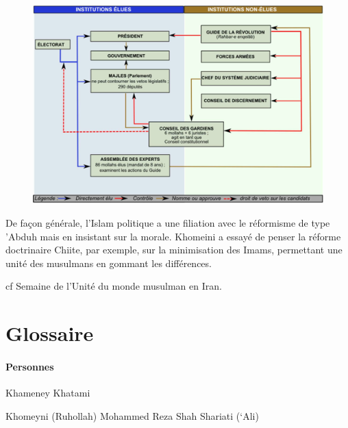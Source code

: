 \begin{figure}[h!]
    \centering
    \includegraphics[width=\textwidth]{CourantsIslamContemporain/ImagesCourantsIslamContemporain/image3.jpeg}
  
    \label{fig:my_label}
\end{figure}
 

   \begin{Synthesis}
  De façon générale, l'Islam politique a une filiation avec le réformisme de type 'Abduh mais en insistant sur la morale.
Khomeini a essayé de penser la réforme doctrinaire Chiite, par exemple, sur la minimisation des Imams, permettant une unité des musulmans en gommant les différences. 
  \end{Synthesis}
cf Semaine de l'Unité du monde musulman en Iran.





\hypertarget{glossaire-6}{%
\section{ {Glossaire}}\label{glossaire-6}}

 
\paragraph{Personnes}



Khameney Khatami

Khomeyni (Ruhollah) Mohammed Reza Shah Shariati (`Ali)

